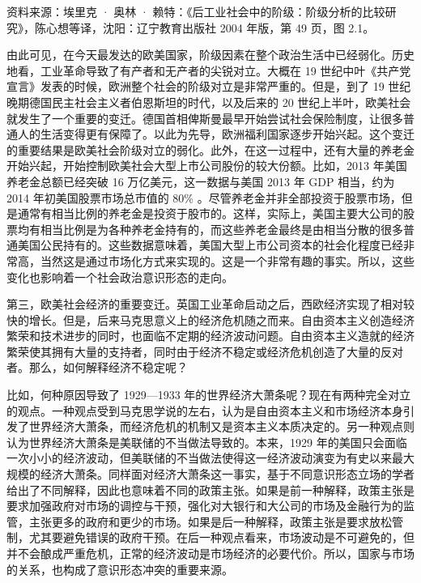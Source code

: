 资料来源：埃里克 · 奥林 · 赖特：《后工业社会中的阶级：阶级分析的比较研究》，陈心想等译，沈阳：辽宁教育出版社 2004 年版，第 49 页，图 2.1。

由此可见，在今天最发达的欧美国家，阶级因素在整个政治生活中已经弱化。历史地看，工业革命导致了有产者和无产者的尖锐对立。大概在 19 世纪中叶《共产党宣言》发表的时候，欧洲整个社会的阶级对立是非常严重的。但是，到了 19 世纪晚期德国民主社会主义者伯恩斯坦的时代，以及后来的 20 世纪上半叶，欧美社会就发生了一个重要的变迁。德国首相俾斯曼最早开始尝试社会保险制度，让很多普通人的生活变得更有保障了。以此为先导，欧洲福利国家逐步开始兴起。这个变迁的重要结果是欧美社会阶级对立的弱化。此外，在这一过程中，还有大量的养老金开始兴起，开始控制欧美社会大型上市公司股份的较大份额。比如，2013 年美国养老金总额已经突破 16 万亿美元，这一数据与美国 2013 年 GDP 相当，约为 2014 年初美国股票市场总市值的 80\% 。尽管养老金并非全部投资于股票市场，但是通常有相当比例的养老金是投资于股市的。这样，实际上，美国主要大公司的股票均有相当比例是为各种养老金持有的，而这些养老金最终是由相当分散的很多普通美国公民持有的。这些数据意味着，美国大型上市公司资本的社会化程度已经非常高，当然这是通过市场化方式来实现的。这是一个非常有趣的事实。所以，这些变化也影响着一个社会政治意识形态的走向。

第三，欧美社会经济的重要变迁。英国工业革命启动之后，西欧经济实现了相对较快的增长。但是，后来马克思意义上的经济危机随之而来。自由资本主义创造经济繁荣和技术进步的同时，也面临不定期的经济波动问题。自由资本主义造就的经济繁荣使其拥有大量的支持者，同时由于经济不稳定或经济危机创造了大量的反对者。那么，如何解释经济不稳定呢？

比如，何种原因导致了 1929—1933 年的世界经济大萧条呢？现在有两种完全对立的观点。一种观点受到马克思学说的左右，认为是自由资本主义和市场经济本身引发了世界经济大萧条，而经济危机的机制又是资本主义本质决定的。另一种观点则认为世界经济大萧条是美联储的不当做法导致的。本来，1929 年的美国只会面临一次小小的经济波动，但美联储的不当做法使得这一经济波动演变为有史以来最大规模的经济大萧条。同样面对经济大萧条这一事实，基于不同意识形态立场的学者给出了不同解释，因此也意味着不同的政策主张。如果是前一种解释，政策主张是要求加强政府对市场的调控与干预，强化对大银行和大公司的市场及金融行为的监管，主张更多的政府和更少的市场。如果是后一种解释，政策主张是要求放松管制，尤其要避免错误的政府干预。在后一种观点看来，市场波动是不可避免的，但并不会酿成严重危机，正常的经济波动是市场经济的必要代价。所以，国家与市场的关系，也构成了意识形态冲突的重要来源。

